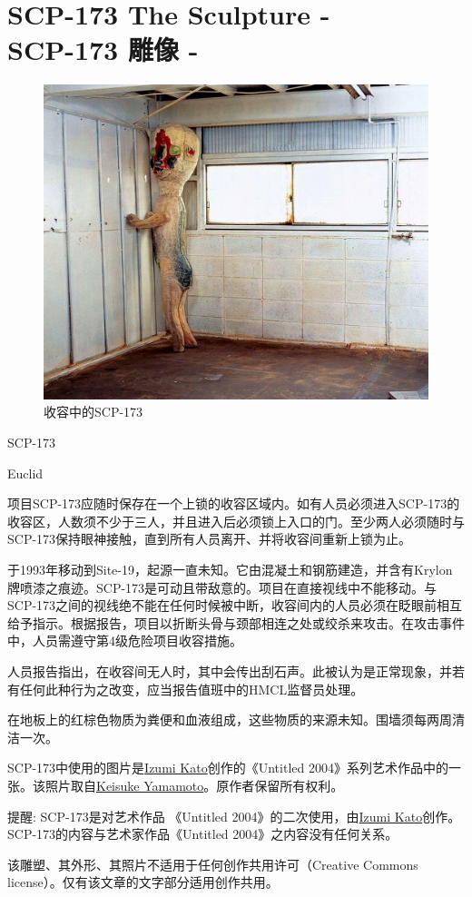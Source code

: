 \chapter[SCP-173 雕像]{
    SCP-173 The Sculpture - \\
    SCP-173 雕像 - 
}

\label{chap:SCP-173}

\heritage

\begin{figure}[H]
    \centering
    \includegraphics[width=0.5\linewidth]{images/SCP-173.jpg}
    \caption*{收容中的SCP-173}
\end{figure}

SCP-173

Euclid

项目SCP-173应随时保存在一个上锁的收容区域内。如有人员必须进入SCP-173的收容区，人数须不少于三人，并且进入后必须锁上入口的门。至少两人必须随时与SCP-173保持眼神接触，直到所有人员离开、并将收容间重新上锁为止。

于1993年移动到Site-19，起源一直未知。它由混凝土和钢筋建造，并含有Krylon牌喷漆之痕迹。SCP-173是可动且带敌意的。项目在直接视线中不能移动。与SCP-173之间的视线绝不能在任何时候被中断，收容间内的人员必须在眨眼前相互给予指示。根据报告，项目以折断头骨与颈部相连之处或绞杀来攻击。在攻击事件中，人员需遵守第4级危险项目收容措施。

人员报告指出，在收容间无人时，其中会传出刮石声。此被认为是正常现象，并若有任何此种行为之改变，应当报告值班中的HMCL监督员处理。

在地板上的红棕色物质为粪便和血液组成，这些物质的来源未知。围墙须每两周清洁一次。

\hr


\scriptsize{SCP-173中使用的图片是\href{http://izumikato.com/\#Untitled-2004}{Izumi Kato}创作的《Untitled 2004》系列艺术作品中的一张。该照片取自\href{http://www.scaithebathhouse.com/en/exhibitions/2005/04/izumi\_kato/}{Keisuke Yamamoto}。原作者保留所有权利。}

\scriptsize{提醒: SCP-173是对艺术作品 《Untitled 2004》的二次使用，由\href{http://izumikato.com/\#Untitled-2004}{Izumi Kato}创作。SCP-173的内容与艺术家作品《Untitled 2004》之内容没有任何关系。}

\scriptsize{该雕塑、其外形、其照片不适用于任何创作共用许可（Creative Commons license）。仅有该文章的文字部分适用创作共用。}

